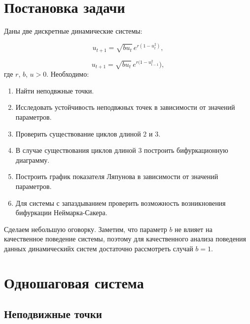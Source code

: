 \documentclass[12pt, a4paper]{article} %
\begin{document}


\tableofcontents

\newpage

\section{Постановка задачи}

Даны две дискретные динамические системы:

\begin{equation}\label{eq:1}
    u_{t+1} = \sqrt{bu_t}\,e^{r(1 - u_t^2)}
,\end{equation} 

\begin{equation}\label{eq:2}
u_{t+1} = \sqrt{bu_t}\,e^{r(1 - u_{t-1}^2})
,\end{equation} 
где $r$,  $b$, $u > 0$.
Необходимо:
 \begin{enumerate}
     \item Найти неподвжные точки.
     \item Исследовать устойчивость неподвжных точек в зависимости от 
         значений параметров.
     \item Проверить существование циклов длиной $2$ и $3$.
     \item В случае существования циклов длиной $3$ построить 
         бифуркационную диаграмму.
     \item Построить график показателя Ляпунова в зависимости от значений 
         параметров.
     \item Для системы с запаздыванием проверить возможность возникновения
         бифуркации Неймарка-Сакера.
\end{enumerate}

Сделаем небольшую оговорку.
Заметим, что параметр $b$ не влияет на качественное поведение системы,
поэтому для качественного анализа поведения данных динамическийх систем 
достаточно рассмотреть случай $b = 1$.

\section{Одношаговая система}

\subsection{Неподвижные точки}
\end{document}
